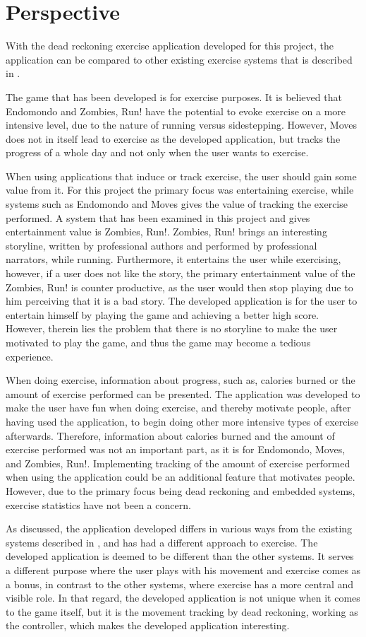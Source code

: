 \section{Perspective}
With the dead reckoning exercise application developed for this project, the application can be compared to other existing exercise systems that is described in .

The game that has been developed is for exercise purposes.
It is believed that Endomondo and Zombies, Run! have the potential to evoke exercise on a more intensive level, due to the nature of running versus sidestepping.
However, Moves does not in itself lead to exercise as the developed application, but tracks the progress of a whole day and not only when the user wants to exercise.

When using applications that induce or track exercise, the user should gain some value from it.
For this project the primary focus was entertaining exercise, while systems such as Endomondo and Moves gives the value of tracking the exercise performed.
A system that has been examined in this project and gives entertainment value is Zombies, Run!.
Zombies, Run! brings an interesting storyline, written by professional authors and performed by professional narrators, while running.
Furthermore, it entertains the user while exercising, however, if a user does not like the story, the primary entertainment value of the Zombies, Run! is counter productive, as the user would then stop playing due to him perceiving that it is a bad story.
The developed application is for the user to entertain himself by playing the game and achieving a better high score. 
However, therein lies the problem that there is no storyline to make the user motivated to play the game, and thus the game may become a tedious experience.

When doing exercise, information about progress, such as, calories burned or the amount of exercise performed can be presented.
The application was developed to make the user have fun when doing exercise, and thereby motivate people, after having used the application, to begin doing other more intensive types of exercise afterwards.
Therefore, information about calories burned and the amount of exercise performed was not an important part, as it is for Endomondo, Moves, and Zombies, Run!.
Implementing tracking of the amount of exercise performed when using the application could be an additional feature that motivates people.
However, due to the primary focus being dead reckoning and embedded systems, exercise statistics have  not been a concern.

As discussed, the application developed differs in various ways from the existing systems described in , and has had a different approach to exercise.
The developed application is deemed to be different than the other systems.
It serves a different purpose where the user plays with his movement and exercise comes as a bonus, in contrast to the other systems, where exercise has a more central and visible role. 
In that regard, the developed application is not unique when it comes to the game itself, but it is the movement tracking by dead reckoning, working as the controller, which makes the developed application interesting.